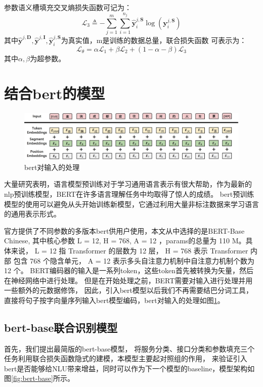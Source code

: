   参数语义槽填充交叉熵损失函数可记为：
  \begin{equation}
    \mathcal{L}_{3} \triangleq-\sum_{j=1}^{m} \sum_{i=1}^{n_{j}} \hat{\mathbf{y}}_{i}^{j, \mathbf{S}} \log \left(\mathbf{y}_{i}^{j, \mathbf{S}}\right)
  \end{equation}
  其中$\hat{\mathbf{y}}^{j, \mathbf{D}},\hat{\mathbf{y}}^{j, \mathbf{I}},\hat{\mathbf{y}}_{i}^{j, \mathbf{S}}$为真实值，m是训练的数据总量，联合损失函数
  可表示为：
  \begin{equation}
    \mathcal{L}_{\theta}=\alpha \mathcal{L}_{1}+\beta \mathcal{L}_{2}+(1-\alpha-\beta) \mathcal{L}_{3}
  \end{equation}
  其中$\alpha,\beta$为超参数。

\section{结合bert的模型}
\begin{figure}[htbp]
  \centering
  \includegraphics[width=16cm]{./images/bertInput.jpg}
  \caption{bert对输入的处理}
  \label{fig:bertInput}
\end{figure}

大量研究表明，语言模型预训练对于学习通用语言表示有很大帮助，作为最新的nlp预训练模型，BERT在许多语言理解任务中均取得了惊人的成绩。
bert预训练模型的使用可以避免从头开始训练新模型，它通过利用大量非标注数据来学习语言的通用表示形式。

官方提供了不同参数的多版本bert供用户使用，本文从中选择的是BERT-Base Chinese,
其中核心参数 L = 12, H = 768, A = 12 ，params的总量为 110 M。具体来说， L = 12 指 Transformer 的层数为 12 层，
 H = 768 表示 Transformer 内部 包含 768 个隐含单元， A = 12 表示多头自注意力机制中自注意力机制个数为 12 个\cite{devlin2018bert}。
BERT编码器的输入是一系列token，这些token首先被转换为矢量，然后在神经网络中进行处理。
但是在开始处理之前，BERT需要对输入进行处理并用一些额外的元数据修饰，
因此，引入bert模型以后我们不再需要结巴分词工具，直接将句子按字向量序列输入bert模型编码，bert对输入的处理如图\ref{fig:bertInput}。


\subsection{bert-base联合识别模型}
首先，我们提出最简版的bert-base模型，
将服务分类、接口分类和参数填充三个任务利用联合损失函数隐式的建模，本模型主要起对照组的作用，
来验证引入bert是否能够给NLU带来增益，同时可以作为下一个模型的baseline，模型架构如图\ref{fig:bert-base}所示。

